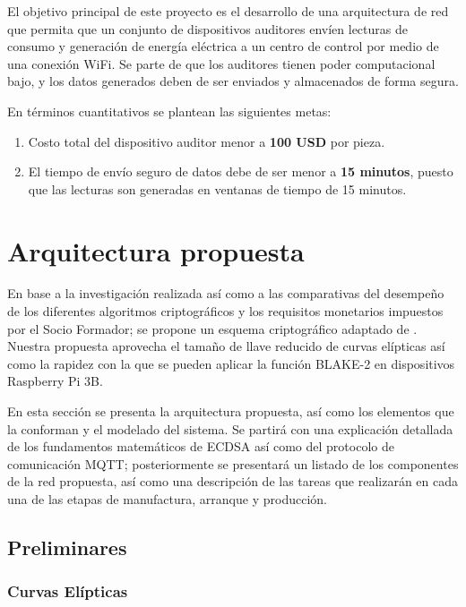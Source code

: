 \documentclass{article}
\begin{document}
        El objetivo principal de este proyecto es el desarrollo de una arquitectura de red que permita que un conjunto de dispositivos auditores envíen lecturas de consumo y generación de energía eléctrica a un centro de control por medio de una conexión WiFi. Se parte de que los auditores tienen poder computacional bajo, y los datos generados deben de ser enviados y almacenados de forma segura.

        En términos cuantitativos se plantean las siguientes metas:
        \begin{enumerate}
            \item Costo total del dispositivo auditor menor a \textbf{100 USD} por pieza.
            \item El tiempo de envío seguro de datos debe de ser menor a \textbf{15 minutos}, puesto que las lecturas son generadas en ventanas de tiempo de 15 minutos.
        \end{enumerate}

    \section{Arquitectura propuesta}

        En base a la investigación realizada así como a las comparativas del desempeño de los diferentes algoritmos criptográficos y los requisitos monetarios impuestos por el Socio Formador; se propone un esquema criptográfico adaptado de \cite{lohachab2019ecc}. Nuestra propuesta aprovecha el tamaño de llave reducido de curvas elípticas así como la rapidez con la que se pueden aplicar la función BLAKE-2 en dispositivos Raspberry Pi 3B.

        En esta sección se presenta la arquitectura propuesta, así como los elementos que la conforman y el modelado del sistema. Se partirá con una explicación detallada de los fundamentos matemáticos de ECDSA así como del protocolo de comunicación MQTT; posteriormente se presentará un listado de los componentes de la red propuesta, así como una descripción de las tareas que realizarán en cada una de las etapas de manufactura, arranque y producción.

        \subsection{Preliminares}

            \subsubsection{Curvas Elípticas}
\end{document}
